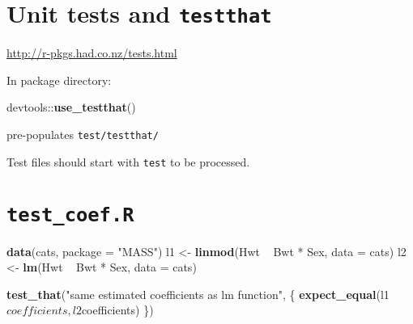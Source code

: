\documentclass[]{book}
\newenvironment{Shaded}{\begin{snugshade}}{\end{snugshade}}
\newcommand{\KeywordTok}[1]{\textcolor[rgb]{0.13,0.29,0.53}{\textbf{{#1}}}}
\newcommand{\DataTypeTok}[1]{\textcolor[rgb]{0.13,0.29,0.53}{{#1}}}
\newcommand{\StringTok}[1]{\textcolor[rgb]{0.31,0.60,0.02}{{#1}}}
\newcommand{\NormalTok}[1]{{#1}}
\theoremstyle{definition}
\theoremstyle{definition}
\theoremstyle{definition}
\theoremstyle{remark}
\begin{document}
\begin{Shaded}
\end{Shaded}

\section{\texorpdfstring{Unit tests and
\texttt{testthat}}{Unit tests and testthat}}\label{unit-tests-and-testthat}

\url{http://r-pkgs.had.co.nz/tests.html}

In package directory:

\begin{Shaded}
\begin{Highlighting}[]
\NormalTok{devtools::}\KeywordTok{use_testthat}\NormalTok{()}
\end{Highlighting}
\end{Shaded}

pre-populates \texttt{test/testthat/}

Test files should start with \texttt{test} to be processed.

\section{\texorpdfstring{\texttt{test\_coef.R}}{test\_coef.R}}\label{test_coef.r}

\begin{Shaded}
\begin{Highlighting}[]
\KeywordTok{data}\NormalTok{(cats, }\DataTypeTok{package =} \StringTok{"MASS"}\NormalTok{)}
\NormalTok{l1 <-}\StringTok{ }\KeywordTok{linmod}\NormalTok{(Hwt ~}\StringTok{ }\NormalTok{Bwt *}\StringTok{ }\NormalTok{Sex, }\DataTypeTok{data =} \NormalTok{cats)}
\NormalTok{l2 <-}\StringTok{ }\KeywordTok{lm}\NormalTok{(Hwt ~}\StringTok{ }\NormalTok{Bwt *}\StringTok{ }\NormalTok{Sex, }\DataTypeTok{data =} \NormalTok{cats)}

\KeywordTok{test_that}\NormalTok{(}\StringTok{"same estimated coefficients as lm function"}\NormalTok{, \{}
  \KeywordTok{expect_equal}\NormalTok{(l1$coefficients, l2$coefficients)}
\NormalTok{\})}
\end{Highlighting}
\end{Shaded}
\end{document}
